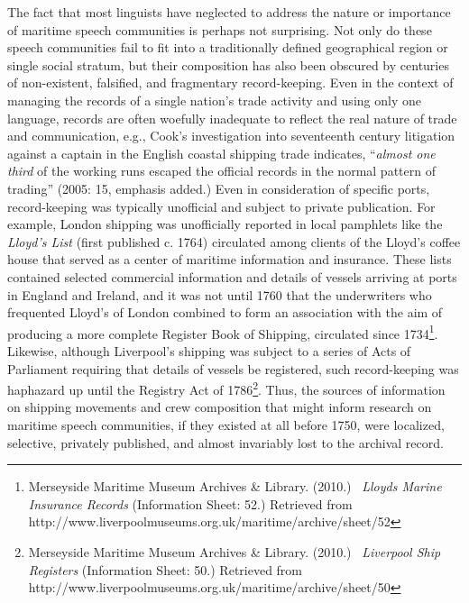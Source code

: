 \begin{styleStandard}
The fact that most linguists have neglected to address the nature or importance of maritime speech communities is perhaps not surprising. Not only do these speech communities fail to fit into a traditionally defined geographical region or single social stratum, but their composition has also been obscured by centuries of non-existent, falsified, and fragmentary record-keeping. Even in the context of managing the records of a single nation’s trade activity and using only one language, records are often woefully inadequate to reflect the real nature of trade and communication, e.g., Cook’s investigation into seventeenth century litigation against a captain in the English coastal shipping trade indicates, “\textit{almost one third} of the working runs escaped the official records in the normal pattern of trading” (2005: 15, emphasis added.) Even in consideration of specific ports, record-keeping was typically unofficial and subject to private publication. For example, London shipping was unofficially reported in local pamphlets like the \textit{Lloyd's List }(first published c. 1764) circulated among clients of the Lloyd’s coffee house that served as a center of maritime information and insurance. These lists contained selected commercial information and details of vessels arriving at ports in England and Ireland, and it was not until 1760 that the underwriters who frequented Lloyd’s of London combined to form an association with the aim of producing a more complete Register Book of Shipping, circulated since 1734\footnote{ Merseyside Maritime Museum Archives \& Library. (2010.) \ \textit{Lloyds Marine Insurance Records} (Information Sheet: 52.) Retrieved from http://www.liverpoolmuseums.org.uk/maritime/archive/sheet/52}. Likewise, although Liverpool’s shipping was subject to a series of Acts of Parliament requiring that details of vessels be registered, such record-keeping was haphazard up until the Registry Act of 1786\footnote{ Merseyside Maritime Museum Archives \& Library. (2010.) \ \textit{Liverpool Ship Registers} (Information Sheet: 50.) Retrieved from http://www.liverpoolmuseums.org.uk/maritime/archive/sheet/50}. Thus, the sources of information on shipping movements and crew composition that might inform research on maritime speech communities, if they existed at all before 1750, were localized, selective, privately published, and almost invariably lost to the archival record. 
\end{styleStandard}

